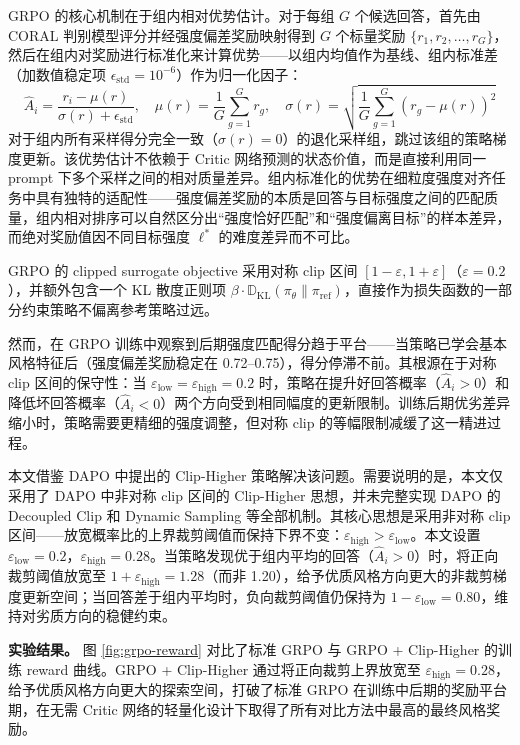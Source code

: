 \documentclass[fontset=fandol,type=master,campus=shenzhen,etitleauto=true]{hithesisbook}
\begin{document}
GRPO 的核心机制在于组内相对优势估计。对于每组 $G$ 个候选回答，首先由 CORAL 判别模型评分并经强度偏差奖励映射得到 $G$ 个标量奖励 $\{r_1, r_2, \ldots, r_G\}$，然后在组内对奖励进行标准化来计算优势------以组内均值作为基线、组内标准差（加数值稳定项 $\epsilon_{\text{std}} = 10^{-6}$）作为归一化因子：
\begin{equation}
\hat{A}_i = \frac{r_i - \mu(r)}{\sigma(r) + \epsilon_{\text{std}}}, \quad \mu(r) = \frac{1}{G}\sum_{g=1}^{G} r_g, \quad \sigma(r) = \sqrt{\frac{1}{G}\sum_{g=1}^{G}(r_g - \mu(r))^2}
\end{equation}
对于组内所有采样得分完全一致（$\sigma(r) = 0$）的退化采样组，跳过该组的策略梯度更新。该优势估计不依赖于 Critic 网络预测的状态价值，而是直接利用同一 prompt 下多个采样之间的相对质量差异。组内标准化的优势在细粒度强度对齐任务中具有独特的适配性------强度偏差奖励的本质是回答与目标强度之间的匹配质量，组内相对排序可以自然区分出``强度恰好匹配''和``强度偏离目标''的样本差异，而绝对奖励值因不同目标强度 $\ell^*$ 的难度差异而不可比。

GRPO 的 clipped surrogate objective 采用对称 clip 区间 $[1-\varepsilon, 1+\varepsilon]$（$\varepsilon = 0.2$），并额外包含一个 KL 散度正则项 $\beta \cdot \mathbb{D}_{\text{KL}}(\pi_\theta \parallel \pi_{\text{ref}})$，直接作为损失函数的一部分约束策略不偏离参考策略过远。

然而，在 GRPO 训练中观察到后期强度匹配得分趋于平台------当策略已学会基本风格特征后（强度偏差奖励稳定在 0.72--0.75），得分停滞不前。其根源在于对称 clip 区间的保守性：当 $\varepsilon_{\text{low}} = \varepsilon_{\text{high}} = 0.2$ 时，策略在提升好回答概率（$\hat{A}_i > 0$）和降低坏回答概率（$\hat{A}_i < 0$）两个方向受到相同幅度的更新限制。训练后期优劣差异缩小时，策略需要更精细的强度调整，但对称 clip 的等幅限制减缓了这一精进过程。

本文借鉴 DAPO 中提出的 Clip-Higher 策略解决该问题。需要说明的是，本文仅采用了 DAPO 中非对称 clip 区间的 Clip-Higher 思想，并未完整实现 DAPO 的 Decoupled Clip 和 Dynamic Sampling 等全部机制。其核心思想是采用非对称 clip 区间------放宽概率比的上界裁剪阈值而保持下界不变：$\varepsilon_{\text{high}} > \varepsilon_{\text{low}}$。本文设置 $\varepsilon_{\text{low}} = 0.2$，$\varepsilon_{\text{high}} = 0.28$。当策略发现优于组内平均的回答（$\hat{A}_i > 0$）时，将正向裁剪阈值放宽至 $1 + \varepsilon_{\text{high}} = 1.28$（而非 1.20），给予优质风格方向更大的非裁剪梯度更新空间；当回答差于组内平均时，负向裁剪阈值仍保持为 $1 - \varepsilon_{\text{low}} = 0.80$，维持对劣质方向的稳健约束。

\textbf{实验结果。} 图 \ref{fig:grpo-reward} 对比了标准 GRPO 与 GRPO + Clip-Higher 的训练 reward 曲线。GRPO + Clip-Higher 通过将正向裁剪上界放宽至 $\varepsilon_{\text{high}} = 0.28$，给予优质风格方向更大的探索空间，打破了标准 GRPO 在训练中后期的奖励平台期，在无需 Critic 网络的轻量化设计下取得了所有对比方法中最高的最终风格奖励。
\end{document}
